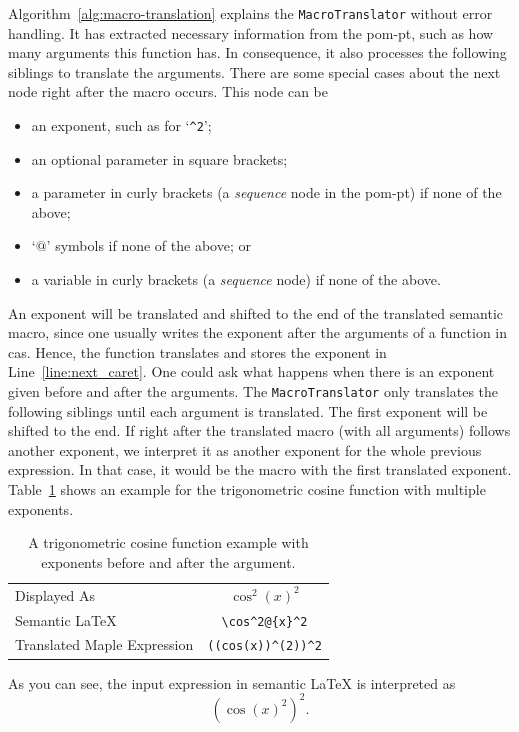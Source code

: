 \documentclass[a4paper,11pt]{article}
\newcommand{\Maple}{Maple}
\theoremstyle{defTheoStyle}
\theoremstyle{defExampStyle}
\begin{document}
Algorithm~\ref{alg:macro-translation} explains the \verb|MacroTranslator| without error handling. It has extracted necessary information from the \gls*{pom-pt}, such as how many arguments this function has. In consequence, it also processes the following siblings to translate the arguments. There are some special cases about the next node right after the macro occurs. This node can be
\begin{itemize}
\item an exponent, such as for `\verb|^2|';
\item an optional parameter in square brackets;
\item a parameter in curly brackets (a \textit{sequence} node in the \gls*{pom-pt}) if none of the above;
\item `$@$' symbols if none of the above; or
\item a variable in curly brackets (a \textit{sequence} node) if none of the above.
\end{itemize}

An exponent will be translated and shifted to the end of the translated semantic macro, 
since one usually writes the exponent after the arguments of a function in \gls*{cas}. Hence, the function translates and stores the exponent in Line~\ref{line:next_caret}. One could ask what happens when there is an exponent given before and after the arguments. The \verb|MacroTranslator| only translates the following siblings until each argument is translated. The first exponent will be shifted to the end. If right after the translated macro (with all arguments) follows another exponent, we interpret it as another exponent for the whole previous expression. In that case, it would be the macro with the first translated exponent. Table~\ref{tab:multi-expo} shows an example for the trigonometric cosine function with multiple exponents. 
\begin{table}[ht]
\centering
\begin{tabular}{lc}
\hline
Displayed As & \rule{0pt}{0.9\normalbaselineskip} $\cos^2(x)^2$ \\
Semantic \LaTeX & \verb|\cos^2@{x}^2| \\
Translated \Maple{} Expression & \verb|((cos(x))^(2))^2|\\
\hline
\end{tabular}
\caption{A trigonometric cosine function example with exponents before and after the argument.}
\label{tab:multi-expo}
\end{table}

As you can see, the input expression in semantic \LaTeX{} is interpreted as
\begin{equation}\label{eq:multi-expo}
\left( \cos(x)^2 \right)^2.
\end{equation}
\end{document}
